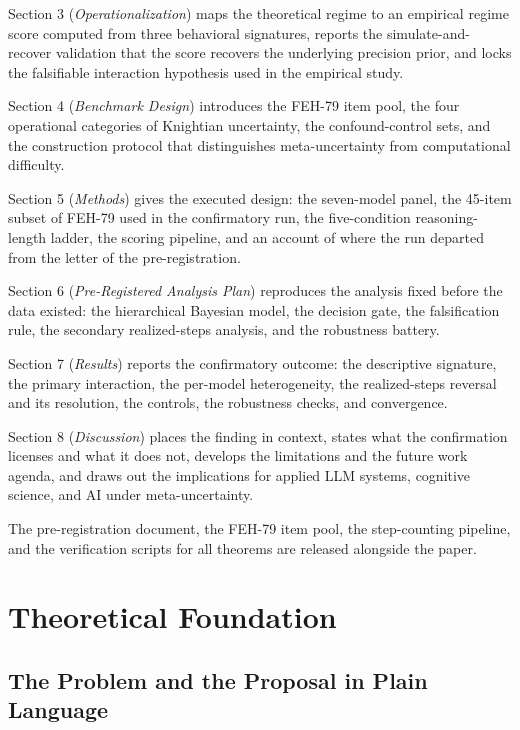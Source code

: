 \documentclass{article}
\begin{document}
Section 3 (\emph{Operationalization}) maps the theoretical regime to an
empirical regime score computed from three behavioral signatures,
reports the simulate-and-recover validation that the score recovers the
underlying precision prior, and locks the falsifiable interaction
hypothesis used in the empirical study.

Section 4 (\emph{Benchmark Design}) introduces the FEH-79 item pool, the
four operational categories of Knightian uncertainty, the
confound-control sets, and the construction protocol that distinguishes
meta-uncertainty from computational difficulty.

Section 5 (\emph{Methods}) gives the executed design: the seven-model
panel, the 45-item subset of FEH-79 used in the confirmatory run, the
five-condition reasoning-length ladder, the scoring pipeline, and an
account of where the run departed from the letter of the
pre-registration.

Section 6 (\emph{Pre-Registered Analysis Plan}) reproduces the analysis
fixed before the data existed: the hierarchical Bayesian model, the
decision gate, the falsification rule, the secondary realized-steps
analysis, and the robustness battery.

Section 7 (\emph{Results}) reports the confirmatory outcome: the
descriptive signature, the primary interaction, the per-model
heterogeneity, the realized-steps reversal and its resolution, the
controls, the robustness checks, and convergence.

Section 8 (\emph{Discussion}) places the finding in context, states what
the confirmation licenses and what it does not, develops the limitations
and the future work agenda, and draws out the implications for applied
LLM systems, cognitive science, and AI under meta-uncertainty.

The pre-registration document, the FEH-79 item pool, the step-counting
pipeline, and the verification scripts for all theorems are released
alongside the paper.

\section{Theoretical
Foundation}\label{chapter-2-theoretical-foundation}

\subsection{The Problem and the Proposal in Plain
Language}\label{the-problem-and-the-proposal-in-plain-language}
\end{document}
